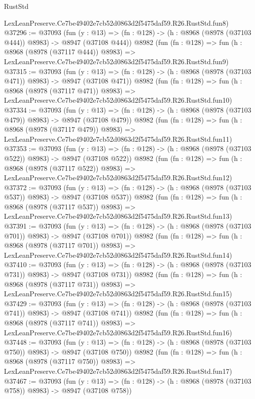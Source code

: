 \begin{lexlean}{RustStd}
\begin{coremodule}
    LexLeanPreserve.Ce7be49402e7cb52d0863d2f5475daf59.R26.RustStd.fun8)
@37296 := @37093
    (fun (y : @13) => (fn : @128) -> (h : @8968 (@8978 (@37103 @444)) @8983) -> @8947 (@37108 @444))
    @8982
    (fun (fn : @128) =>
    fun (h : @8968 (@8978 (@37117 @444)) @8983) =>
    LexLeanPreserve.Ce7be49402e7cb52d0863d2f5475daf59.R26.RustStd.fun9)
@37315 := @37093
    (fun (y : @13) => (fn : @128) -> (h : @8968 (@8978 (@37103 @471)) @8983) -> @8947 (@37108 @471))
    @8982
    (fun (fn : @128) =>
    fun (h : @8968 (@8978 (@37117 @471)) @8983) =>
    LexLeanPreserve.Ce7be49402e7cb52d0863d2f5475daf59.R26.RustStd.fun10)
@37334 := @37093
    (fun (y : @13) => (fn : @128) -> (h : @8968 (@8978 (@37103 @479)) @8983) -> @8947 (@37108 @479))
    @8982
    (fun (fn : @128) =>
    fun (h : @8968 (@8978 (@37117 @479)) @8983) =>
    LexLeanPreserve.Ce7be49402e7cb52d0863d2f5475daf59.R26.RustStd.fun11)
@37353 := @37093
    (fun (y : @13) => (fn : @128) -> (h : @8968 (@8978 (@37103 @522)) @8983) -> @8947 (@37108 @522))
    @8982
    (fun (fn : @128) =>
    fun (h : @8968 (@8978 (@37117 @522)) @8983) =>
    LexLeanPreserve.Ce7be49402e7cb52d0863d2f5475daf59.R26.RustStd.fun12)
@37372 := @37093
    (fun (y : @13) => (fn : @128) -> (h : @8968 (@8978 (@37103 @537)) @8983) -> @8947 (@37108 @537))
    @8982
    (fun (fn : @128) =>
    fun (h : @8968 (@8978 (@37117 @537)) @8983) =>
    LexLeanPreserve.Ce7be49402e7cb52d0863d2f5475daf59.R26.RustStd.fun13)
@37391 := @37093
    (fun (y : @13) => (fn : @128) -> (h : @8968 (@8978 (@37103 @701)) @8983) -> @8947 (@37108 @701))
    @8982
    (fun (fn : @128) =>
    fun (h : @8968 (@8978 (@37117 @701)) @8983) =>
    LexLeanPreserve.Ce7be49402e7cb52d0863d2f5475daf59.R26.RustStd.fun14)
@37410 := @37093
    (fun (y : @13) => (fn : @128) -> (h : @8968 (@8978 (@37103 @731)) @8983) -> @8947 (@37108 @731))
    @8982
    (fun (fn : @128) =>
    fun (h : @8968 (@8978 (@37117 @731)) @8983) =>
    LexLeanPreserve.Ce7be49402e7cb52d0863d2f5475daf59.R26.RustStd.fun15)
@37429 := @37093
    (fun (y : @13) => (fn : @128) -> (h : @8968 (@8978 (@37103 @741)) @8983) -> @8947 (@37108 @741))
    @8982
    (fun (fn : @128) =>
    fun (h : @8968 (@8978 (@37117 @741)) @8983) =>
    LexLeanPreserve.Ce7be49402e7cb52d0863d2f5475daf59.R26.RustStd.fun16)
@37448 := @37093
    (fun (y : @13) => (fn : @128) -> (h : @8968 (@8978 (@37103 @750)) @8983) -> @8947 (@37108 @750))
    @8982
    (fun (fn : @128) =>
    fun (h : @8968 (@8978 (@37117 @750)) @8983) =>
    LexLeanPreserve.Ce7be49402e7cb52d0863d2f5475daf59.R26.RustStd.fun17)
@37467 := @37093
    (fun (y : @13) => (fn : @128) -> (h : @8968 (@8978 (@37103 @758)) @8983) -> @8947 (@37108 @758))

\end{coremodule}
\end{lexlean}
